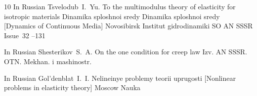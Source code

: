 \begin{thebibliography}{10}
\lang In Russian
\by Tsvelodub~I.~Yu.
\paper To the multimodulus theory of elasticity for isotropic materials
\inbook Dinamika sploshnoi sredy \inbook Dinamika sploshnoi sredy \rm [Dynamics of Continuous Media]
\publaddr Novosibirsk
\publ Institut gidrodinamiki SO AN SSSR
\volinfo Issue~32
--131

  	
\lang In Russian
\by Shesterikov~S.~A.
\paper On the one condition for creep law
\jour Izv. AN SSSR. OTN. Mekhan. i mashinostr.

       
\lang In Russian
\by Gol'denblat~I.~I.
\book Nelineinye problemy teorii uprugosti \rm [Nonlinear problems in elasticity theory]
\yr Moscow
\publ Nauka

  
\end{thebibliography}

\EngDate

\newpage \Russian


%
%